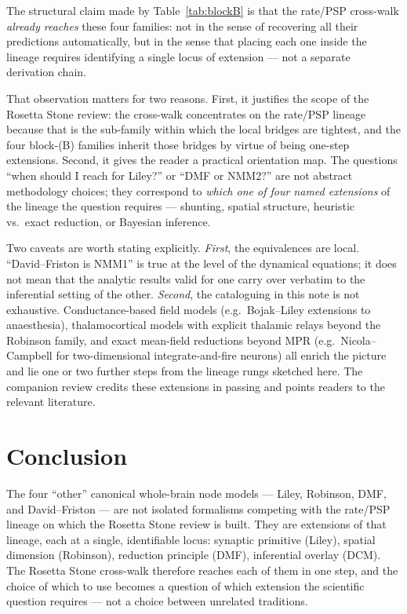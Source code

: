 \documentclass[11pt,a4paper]{article}
\begin{document}
The structural claim made by Table~\ref{tab:blockB} is that the rate/PSP cross-walk \emph{already reaches} these four families: not in the sense of recovering all their predictions automatically, but in the sense that placing each one inside the lineage requires identifying a single locus of extension --- not a separate derivation chain.

That observation matters for two reasons. First, it justifies the scope of the Rosetta Stone review: the cross-walk concentrates on the rate/PSP lineage because that is the sub-family within which the local bridges are tightest, and the four block-(B) families inherit those bridges by virtue of being one-step extensions. Second, it gives the reader a practical orientation map. The questions ``when should I reach for Liley?'' or ``DMF or NMM2?'' are not abstract methodology choices; they correspond to \emph{which one of four named extensions} of the lineage the question requires --- shunting, spatial structure, heuristic vs.\ exact reduction, or Bayesian inference.

Two caveats are worth stating explicitly. \emph{First}, the equivalences are local. ``David--Friston is NMM1'' is true at the level of the dynamical equations; it does not mean that the analytic results valid for one carry over verbatim to the inferential setting of the other. \emph{Second}, the cataloguing in this note is not exhaustive. Conductance-based field models (e.g.\ Bojak--Liley extensions to anaesthesia), thalamocortical models with explicit thalamic relays beyond the Robinson family, and exact mean-field reductions beyond MPR (e.g.\ Nicola--Campbell\cite{NicolaCampbell2013} for two-dimensional integrate-and-fire neurons) all enrich the picture and lie one or two further steps from the lineage rungs sketched here. The companion review credits these extensions in passing and points readers to the relevant literature.

\section{Conclusion}
\label{sec:conclusion}

The four ``other'' canonical whole-brain node models --- Liley, Robinson, DMF, and David--Friston --- are not isolated formalisms competing with the rate/PSP lineage on which the Rosetta Stone review is built. They are extensions of that lineage, each at a single, identifiable locus: synaptic primitive (Liley), spatial dimension (Robinson), reduction principle (DMF), inferential overlay (DCM). The Rosetta Stone cross-walk therefore reaches each of them in one step, and the choice of which to use becomes a question of which extension the scientific question requires --- not a choice between unrelated traditions.
\end{document}

